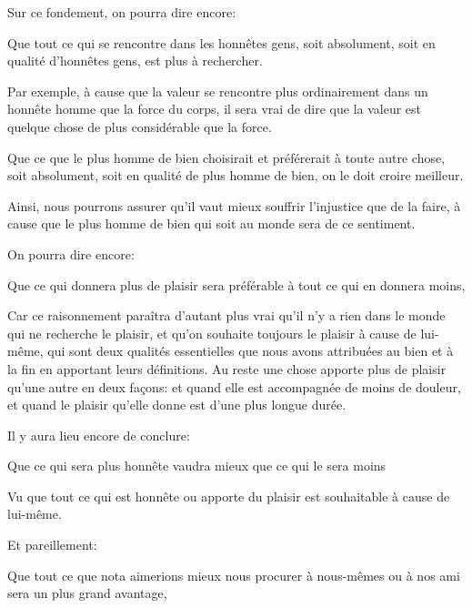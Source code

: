 \bigbreak

Sur ce fondement, on pourra dire encore:

\begin{emphpar}
    Que tout ce qui se rencontre dans les honnêtes gens, soit absolument, soit en qualité d’honnêtes gens, est plus à rechercher.
\end{emphpar}

Par exemple, à cause que la valeur se rencontre plus ordinairement dans un honnête homme que la force du corps, il sera vrai de
dire que la valeur est quelque chose de plus considérable que la force.

\bigbreak

\begin{emphpar}
    Que ce que le plus homme de bien choisirait et préférerait à toute autre chose, soit absolument, soit en qualité de plus homme de
	bien, on le doit croire meilleur.
\end{emphpar}

Ainsi, nous pourrons assurer qu'il vaut mieux souffrir l'injustice que de la faire, à cause que le plus homme de bien qui soit au monde
sera de ce sentiment.

On pourra dire encore:

\begin{emphpar}
    Que ce qui donnera plus de plaisir sera préférable à tout ce qui en donnera moins,
\end{emphpar}

Car ce raisonnement paraîtra d'autant plus vrai qu'il n'y a rien dans le monde qui ne recherche le plaisir, et qu'on souhaite
toujours le plaisir à cause de lui-même, qui sont deux qualités essentielles que nous avons attribuées au bien et à la fin en
apportant leurs définitions. Au reste une chose apporte plus de plaisir qu'une autre en deux façons: et quand elle est
accompagnée de moins de douleur, et quand le plaisir qu'elle donne est d'une plus longue durée.

Il y aura lieu encore de conclure:

\begin{emphpar}
    Que ce qui sera plus honnête vaudra mieux que ce qui le sera moins
\end{emphpar}

Vu que tout ce qui est honnête ou apporte du plaisir est souhaitable à cause de lui-même.

\bigbreak

Et pareillement:

\begin{emphpar}
    Que tout ce que nota aimerions mieux nous procurer à nous-mêmes ou à nos ami sera un plus grand avantage,
\end{emphpar}

